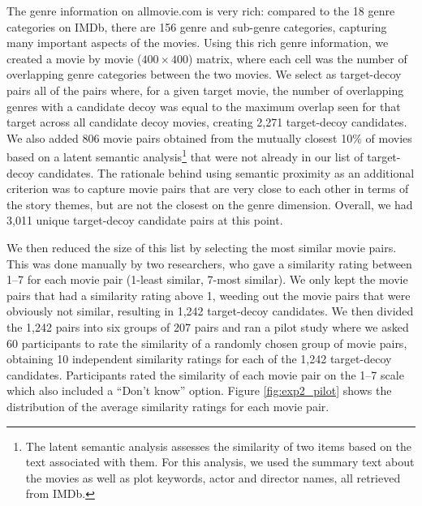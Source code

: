 \documentclass[12pt, a4paper]{article}
\begin{document}
The genre information on allmovie.com is very rich: compared to the 18 genre categories on IMDb, there are 156 genre and sub-genre categories, capturing many important aspects of the movies. Using this rich genre information, we created a movie by movie ($400 \times 400$) matrix, where each cell was the number of overlapping genre categories between the two movies. We select as target-decoy pairs all of the pairs where, for a given target movie, the number of overlapping genres with a candidate decoy was equal to the maximum overlap seen for that target across all candidate decoy movies, creating 2,271 target-decoy candidates. 
We also added 806 movie pairs obtained from the mutually closest 10\% of movies based on a latent semantic analysis\footnote{The latent semantic analysis assesses the similarity of two items based on the text associated with them. For this analysis, we used the summary text about the movies as well as plot keywords, actor and director names, all retrieved from IMDb.} that were not already in our list of target-decoy candidates. The rationale behind using semantic proximity as an additional criterion was to capture movie pairs that are very close to each other in terms of the story themes, but are not the closest on the genre dimension. Overall, we had 3,011 unique target-decoy candidate pairs at this point. 

We then reduced the size of this list by selecting the most similar movie pairs. This was done manually by two researchers, who gave a similarity rating between 1--7 for each movie pair (1-least similar, 7-most similar). We only kept the movie pairs that had a similarity rating above 1, weeding out the movie pairs that were obviously not similar, resulting in 1,242 target-decoy candidates. We then divided the 1,242 pairs into six groups of 207 pairs and ran a pilot study where we asked 60 participants to rate the similarity of a randomly chosen group of movie pairs, obtaining 10 independent similarity ratings for each of the 1,242 target-decoy candidates. Participants rated the similarity of each movie pair on the 1--7 scale which also included a ``Don't know'' option. Figure \ref{fig:exp2_pilot}  shows the distribution of the average similarity ratings for each movie pair. 
\end{document}
